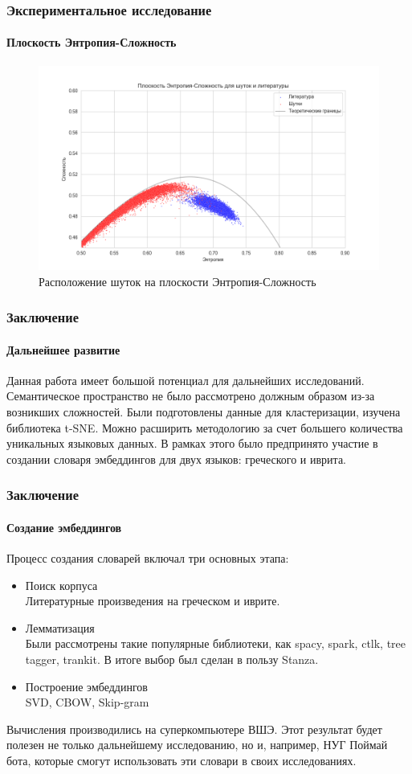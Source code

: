 \documentclass[aspectratio=169]{beamer}
\begin{document}
\begin{frame}
\frametitle{Экспериментальное исследование}
\framesubtitle{Плоскость Энтропия-Сложность}
	
	\begin{figure}[htbp]
            \centering
            \includegraphics[scale=0.4]{image5}
            \caption{Расположение шуток на плоскости Энтропия-Сложность}
            \label{fig:image1}
        \end{figure}

\end{frame}

\begin{frame}
\frametitle{Заключение}
\framesubtitle{Дальнейшее развитие}

Данная работа имеет большой потенциал для дальнейших исследований. Семантическое пространство не было рассмотрено должным образом из-за возникших сложностей. Были подготовлены данные для кластеризации, изучена библиотека t-SNE. Можно расширить методологию за счет большего количества уникальных языковых данных. В рамках этого было предпринято участие в создании словаря эмбеддингов для двух языков: греческого и иврита.
	
\end{frame}

\begin{frame}
\frametitle{Заключение}
\framesubtitle{Создание эмбеддингов}
	Процесс создания словарей включал три основных этапа:
	\begin{itemize}
	\item Поиск корпуса \\
	Литературные произведения на греческом и иврите.
	\item Лемматизация \\
	Были рассмотрены такие популярные библиотеки, как spacy, spark, ctlk, tree tagger, trankit. В итоге выбор был сделан в пользу Stanza\footnotemark[3]. \\
	\item Построение эмбеддингов \\
	SVD, CBOW, Skip-gram
	\end{itemize}
	Вычисления производились на суперкомпьютере ВШЭ. Этот результат будет полезен не только дальнейшему исследованию, но и, например, НУГ Поймай бота, которые смогут использовать эти словари в своих исследованиях.
\end{frame}
\end{document}
